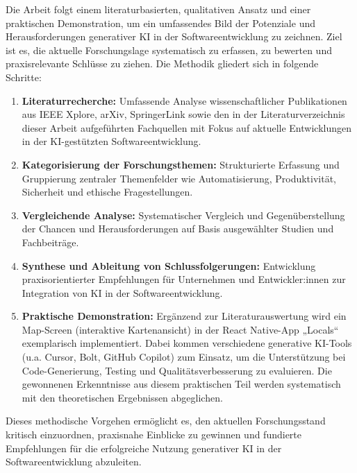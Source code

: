 
Die Arbeit folgt einem literaturbasierten, qualitativen Ansatz und einer
praktischen Demonstration, um ein umfassendes Bild der Potenziale und
Herausforderungen generativer KI in der Softwareentwicklung zu zeichnen. Ziel
ist es, die aktuelle Forschungslage systematisch zu erfassen, zu bewerten und
praxisrelevante Schlüsse zu ziehen. Die Methodik gliedert sich in folgende
Schritte:

\begin{enumerate}
    \item \textbf{Literaturrecherche:} Umfassende Analyse wissenschaftlicher Publikationen aus IEEE Xplore, arXiv, SpringerLink sowie den in der Literaturverzeichnis dieser Arbeit aufgeführten Fachquellen mit Fokus auf aktuelle Entwicklungen in der KI-gestützten Softwareentwicklung.
    \item \textbf{Kategorisierung der Forschungsthemen:} Strukturierte Erfassung und Gruppierung zentraler Themenfelder wie Automatisierung, Produktivität, Sicherheit und ethische Fragestellungen.
    \item \textbf{Vergleichende Analyse:} Systematischer Vergleich und Gegenüberstellung der Chancen und Herausforderungen auf Basis ausgewählter Studien und Fachbeiträge.
    \item \textbf{Synthese und Ableitung von Schlussfolgerungen:} Entwicklung praxisorientierter Empfehlungen für Unternehmen und Entwickler:innen zur Integration von KI in der Softwareentwicklung.
    \item \textbf{Praktische Demonstration:} Ergänzend zur Literaturauswertung wird ein Map-Screen (interaktive Kartenansicht) in der React Native-App „Locals“ exemplarisch implementiert. Dabei kommen verschiedene generative KI-Tools (u.a. Cursor, Bolt, GitHub Copilot) zum Einsatz, um die Unterstützung bei Code-Generierung, Testing und Qualitätsverbesserung zu evaluieren. Die gewonnenen Erkenntnisse aus diesem praktischen Teil werden systematisch mit den theoretischen Ergebnissen abgeglichen.
\end{enumerate}

Dieses methodische Vorgehen ermöglicht es, den aktuellen Forschungsstand
kritisch einzuordnen, praxisnahe Einblicke zu gewinnen und fundierte
Empfehlungen für die erfolgreiche Nutzung generativer KI in der
Softwareentwicklung abzuleiten.
